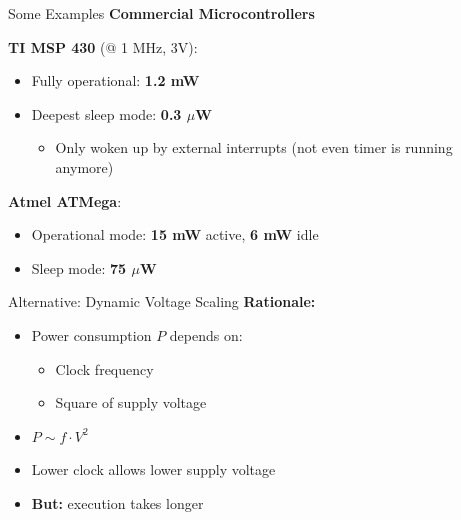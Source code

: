 \documentclass[aspectratio=169,11pt]{beamer}
\begin{document}
\begin{frame}{Some Examples}
    \textbf{Commercial Microcontrollers}
    
    \vspace{0.3cm}
    \textbf{TI MSP 430} (@ 1 MHz, 3V):
    \begin{itemize}
        \item Fully operational: \textbf{1.2 mW}
        \item Deepest sleep mode: \textbf{0.3 $\mu$W}
        \begin{itemize}
            \item Only woken up by external interrupts (not even timer is running anymore)
        \end{itemize}
    \end{itemize}
    
    \vspace{0.3cm}
    \textbf{Atmel ATMega}:
    \begin{itemize}
        \item Operational mode: \textbf{15 mW} active, \textbf{6 mW} idle
        \item Sleep mode: \textbf{75 $\mu$W}
    \end{itemize}
\end{frame}

\begin{frame}{Alternative: Dynamic Voltage Scaling}
    \textbf{Rationale:}
    \begin{itemize}
        \item Power consumption $P$ depends on:
        \begin{itemize}
            \item Clock frequency
            \item Square of supply voltage
        \end{itemize}
        \item $P \sim f \cdot V^2$
        \item Lower clock allows lower supply voltage
        \item \textbf{But:} execution takes longer
    \end{itemize}
\end{frame}
\end{document}
